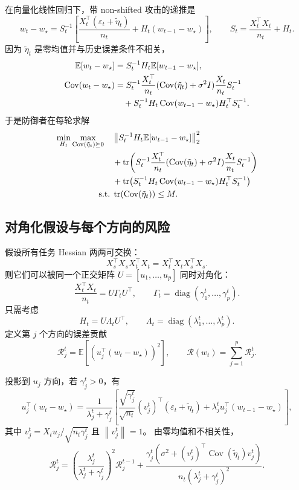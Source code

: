 \documentclass[UTF8,fontset=none,11pt]{ctexart}
\theoremstyle{cnstyle}
\newcommand{\E}{\mathbb{E}}
\newcommand{\Cov}{\operatorname{Cov}}
\newcommand{\tr}{\operatorname{tr}}
\newcommand{\diag}{\operatorname{diag}}
\newcommand{\calR}{\mathcal{R}}
\newcommand{\norm}[1]{\left\lVert #1\right\rVert}
\newcommand{\st}{\;\mathrm{s.t.}\;}
\begin{document}
在向量化线性回归下，带 non-shifted 攻击的递推是
\begin{equation}
  w_t-w_\star
  =
  S_t^{-1}
  \left[
  \frac{X_t^\top(\varepsilon_t+\tilde\eta_t)}{n_t}
  +H_t(w_{t-1}-w_\star)
  \right],
  \qquad
  S_t=\frac{X_t^\top X_t}{n_t}+H_t .
  \label{eq:rfd-recursion}
\end{equation}
因为 \(\tilde\eta_t\) 是零均值并与历史误差条件不相关，
\begin{align}
  \E[w_t-w_\star]
  &=
  S_t^{-1}H_t\E[w_{t-1}-w_\star],
  \label{eq:rfd-mean}\\
  \Cov(w_t-w_\star)
  &=
  S_t^{-1}\frac{X_t^\top}{n_t}
  (\Cov(\tilde\eta_t)+\sigma^2I)
  \frac{X_t}{n_t}S_t^{-1}
  \notag\\
  &\quad+
  S_t^{-1}H_t\Cov(w_{t-1}-w_\star)H_t^\top S_t^{-1}.
  \label{eq:rfd-cov}
\end{align}
于是防御者在每轮求解
\begin{align}
  \min_{H_t}\max_{\Cov(\tilde\eta_t)\succeq0}\quad
  &
  \norm{S_t^{-1}H_t\E[w_{t-1}-w_\star]}_2^2
  \notag\\
  &+
  \tr\!\left(
  S_t^{-1}\frac{X_t^\top}{n_t}
  (\Cov(\tilde\eta_t)+\sigma^2I)
  \frac{X_t}{n_t}S_t^{-1}
  \right)
  \notag\\
  &+
  \tr\!\left(
  S_t^{-1}H_t\Cov(w_{t-1}-w_\star)H_t^\top S_t^{-1}
  \right)
  \notag\\
  \st&
  \tr(\Cov(\tilde\eta_t))\le M .
  \label{eq:rfd-minimax}
\end{align}

\subsection{对角化假设与每个方向的风险}

假设所有任务 Hessian 两两可交换：
\[
  X_s^\top X_sX_t^\top X_t=X_t^\top X_tX_s^\top X_s .
\]
则它们可以被同一个正交矩阵 \(U=[u_1,\dots,u_p]\) 同时对角化：
\[
  \frac{X_t^\top X_t}{n_t}
  =
  U\Gamma_tU^\top,\qquad
  \Gamma_t=\diag(\gamma_1^t,\dots,\gamma_p^t).
\]
只需考虑
\[
  H_t=U\Lambda_tU^\top,\qquad
  \Lambda_t=\diag(\lambda_1^t,\dots,\lambda_p^t).
\]
定义第 \(j\) 个方向的误差贡献
\[
  \calR_j^t=\E[(u_j^\top(w_t-w_\star))^2],
  \qquad
  \calR(w_t)=\sum_{j=1}^p\calR_j^t.
\]

投影到 \(u_j\) 方向，若 \(\gamma_j^t>0\)，有
\begin{equation}
  u_j^\top(w_t-w_\star)
  =
  \frac{1}{\lambda_j^t+\gamma_j^t}
  \left[
  \frac{\sqrt{\gamma_j^t}}{\sqrt{n_t}}(v_j^t)^\top(\varepsilon_t+\tilde\eta_t)
  +\lambda_j^tu_j^\top(w_{t-1}-w_\star)
  \right],
  \label{eq:per-direction}
\end{equation}
其中 \(v_j^t=X_tu_j/\sqrt{n_t\gamma_j^t}\) 且 \(\norm{v_j^t}=1\)。
由零均值和不相关性，
\begin{equation}
  \calR_j^t
  =
  \left(\frac{\lambda_j^t}{\lambda_j^t+\gamma_j^t}\right)^2
  \calR_j^{t-1}
  +
  \frac{
  \gamma_j^t\left(\sigma^2+(v_j^t)^\top\Cov(\tilde\eta_t)v_j^t\right)
  }{
  n_t(\lambda_j^t+\gamma_j^t)^2
  } .
  \label{eq:risk-per-direction}
\end{equation}
\end{document}
